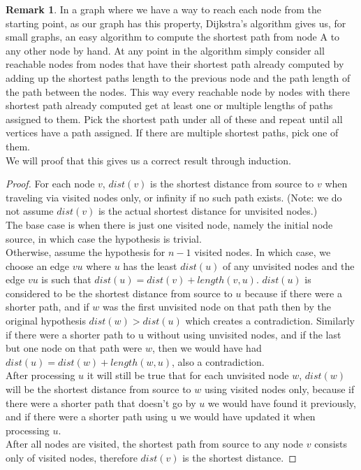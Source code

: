 \documentclass{article}
\theoremstyle{definition}
\newtheorem{example}[theorem]{Remark}
\begin{document}
\begin{example}
In a graph where we have a way to reach each node from the starting point, as our graph has this property, Dijkstra's algorithm gives us, for small graphs, an easy algorithm to compute the shortest path from node A to any other node by hand. At any point in the algorithm simply consider all reachable nodes from nodes that have their shortest path already computed by adding up the shortest paths length to the previous node and the path length of the path between the nodes. This way every reachable node by nodes with there shortest path already computed get at least one or multiple lengths of paths assigned to them. Pick the shortest path under all of these and repeat until all vertices have a path assigned. If there are multiple shortest paths, pick one of them. \\
We will proof that this gives us a correct result through induction.
\begin{proof} 
For each node $v$, $dist(v)$ is the shortest distance from source to $v$ when traveling via visited nodes only, or infinity if no such path exists. (Note: we do not assume $dist(v)$ is the actual shortest distance for unvisited nodes.) \\
The base case is when there is just one visited node, namely the initial node source, in which case the hypothesis is trivial. \\
Otherwise, assume the hypothesis for $n-1$ visited nodes. In which case, we choose an edge $vu$ where $u$ has the least $dist(u)$ of any unvisited nodes and the edge $vu$ is such that $dist(u) = dist(v) + length(v,u)$. $dist(u)$ is considered to be the shortest distance from source to $u$ because if there were a shorter path, and if $w$ was the first unvisited node on that path then by the original hypothesis $dist(w) > dist(u)$ which creates a contradiction. Similarly if there were a shorter path to u without using unvisited nodes, and if the last but one node on that path were $w$, then we would have had $dist(u) = dist(w) + length(w,u)$, also a contradiction. \\
After processing $u$ it will still be true that for each unvisited node $w$, $dist(w)$ will be the shortest distance from source to $w$ using visited nodes only, because if there were a shorter path that doesn't go by $u$ we would have found it previously, and if there were a shorter path using u we would have updated it when processing $u$. \\
After all nodes are visited, the shortest path from source to any node $v$ consists only of visited nodes, therefore $dist(v)$ is the shortest distance.
\end{proof}


\end{example}
\end{document}
